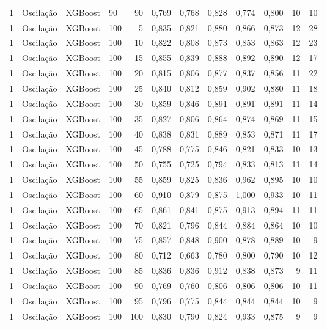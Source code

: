 \begin{longtable}{ccclrrrrrrrr}
1 & Oscilação & XGBoost & 90 & 90 & 0,769 & 0,768 & 0,828 & 0,774 & 0,800 & 10 & 10 \\
1 & Oscilação & XGBoost & 100 & 5 & 0,835 & 0,821 & 0,880 & 0,866 & 0,873 & 12 & 28 \\
1 & Oscilação & XGBoost & 100 & 10 & 0,822 & 0,808 & 0,873 & 0,853 & 0,863 & 12 & 23 \\
1 & Oscilação & XGBoost & 100 & 15 & 0,855 & 0,839 & 0,888 & 0,892 & 0,890 & 12 & 17 \\
1 & Oscilação & XGBoost & 100 & 20 & 0,815 & 0,806 & 0,877 & 0,837 & 0,856 & 11 & 22 \\
1 & Oscilação & XGBoost & 100 & 25 & 0,840 & 0,812 & 0,859 & 0,902 & 0,880 & 11 & 18 \\
1 & Oscilação & XGBoost & 100 & 30 & 0,859 & 0,846 & 0,891 & 0,891 & 0,891 & 11 & 14 \\
1 & Oscilação & XGBoost & 100 & 35 & 0,827 & 0,806 & 0,864 & 0,874 & 0,869 & 11 & 15 \\
1 & Oscilação & XGBoost & 100 & 40 & 0,838 & 0,831 & 0,889 & 0,853 & 0,871 & 11 & 17 \\
1 & Oscilação & XGBoost & 100 & 45 & 0,788 & 0,775 & 0,846 & 0,821 & 0,833 & 10 & 13 \\
1 & Oscilação & XGBoost & 100 & 50 & 0,755 & 0,725 & 0,794 & 0,833 & 0,813 & 11 & 14 \\
1 & Oscilação & XGBoost & 100 & 55 & 0,859 & 0,825 & 0,836 & 0,962 & 0,895 & 10 & 10 \\
1 & Oscilação & XGBoost & 100 & 60 & 0,910 & 0,879 & 0,875 & 1,000 & 0,933 & 10 & 11 \\
1 & Oscilação & XGBoost & 100 & 65 & 0,861 & 0,841 & 0,875 & 0,913 & 0,894 & 11 & 11 \\
1 & Oscilação & XGBoost & 100 & 70 & 0,821 & 0,796 & 0,844 & 0,884 & 0,864 & 10 & 10 \\
1 & Oscilação & XGBoost & 100 & 75 & 0,857 & 0,848 & 0,900 & 0,878 & 0,889 & 10 & 9 \\
1 & Oscilação & XGBoost & 100 & 80 & 0,712 & 0,663 & 0,780 & 0,800 & 0,790 & 10 & 12 \\
1 & Oscilação & XGBoost & 100 & 85 & 0,836 & 0,836 & 0,912 & 0,838 & 0,873 & 9 & 11 \\
1 & Oscilação & XGBoost & 100 & 90 & 0,769 & 0,760 & 0,806 & 0,806 & 0,806 & 10 & 11 \\
1 & Oscilação & XGBoost & 100 & 95 & 0,796 & 0,775 & 0,844 & 0,844 & 0,844 & 10 & 9 \\
1 & Oscilação & XGBoost & 100 & 100 & 0,830 & 0,790 & 0,824 & 0,933 & 0,875 & 9 & 9 \\

\end{longtable}
